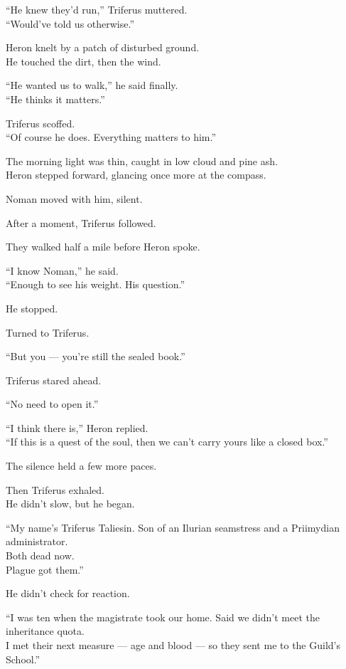 \documentclass[9pt]{article}
\begin{document}
“He knew they’d run,” Triferus muttered.\\
“Would’ve told us otherwise.”

Heron knelt by a patch of disturbed ground.\\
He touched the dirt, then the wind.

“He wanted us to walk,” he said finally.\\
“He thinks it matters.”

\vspace{1em}

Triferus scoffed.\\
“Of course he does. Everything matters to him.”

The morning light was thin, caught in low cloud and pine ash.\\
Heron stepped forward, glancing once more at the compass.

Noman moved with him, silent.

After a moment, Triferus followed.

\vspace{1em}

They walked half a mile before Heron spoke.

“I know Noman,” he said.\\
“Enough to see his weight. His question.”

He stopped.

Turned to Triferus.

“But you — you’re still the sealed book.”

Triferus stared ahead.

“No need to open it.”

“I think there is,” Heron replied.\\
“If this is a quest of the soul, then we can’t carry yours like a closed box.”

\vspace{1em}

The silence held a few more paces.

Then Triferus exhaled.\\
He didn’t slow, but he began.

“My name’s Triferus Taliesin. Son of an Ilurian seamstress and a Priimydian administrator.\\
Both dead now.\\
Plague got them.”

He didn’t check for reaction.

“I was ten when the magistrate took our home. Said we didn’t meet the inheritance quota.\\
I met their next measure — age and blood — so they sent me to the Guild’s School.”
\end{document}
